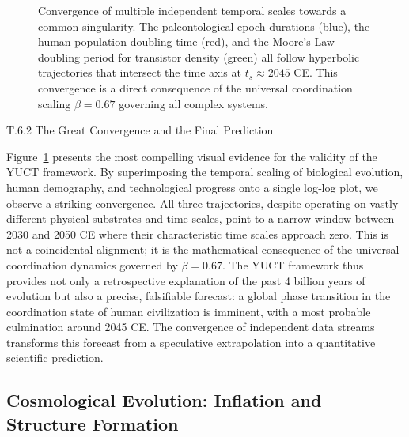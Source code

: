 \documentclass[12pt,a4paper]{article}
\theoremstyle{remark}
\begin{document}
\begin{figure}[htbp]
	\caption{Convergence of multiple independent temporal scales towards a common singularity. The paleontological epoch durations (blue), the human population doubling time (red), and the Moore's Law doubling period for transistor density (green) all follow hyperbolic trajectories that intersect the time axis at $t_s \approx 2045$ CE. This convergence is a direct consequence of the universal coordination scaling $\beta = 0.67$ governing all complex systems.}
	\label{fig:great-convergence}
\end{figure}

T.6.2 The Great Convergence and the Final Prediction

\large Figure~\ref{fig:great-convergence} presents the most compelling visual evidence for the validity of the YUCT framework. By superimposing the temporal scaling of biological evolution, human demography, and technological progress onto a single log‑log plot, we observe a striking convergence. All three trajectories, despite operating on vastly different physical substrates and time scales, point to a narrow window between 2030 and 2050 CE where their characteristic time scales approach zero. This is not a coincidental alignment; it is the mathematical consequence of the universal coordination dynamics governed by $\beta = 0.67$. The YUCT framework thus provides not only a retrospective explanation of the past 4 billion years of evolution but also a precise, falsifiable forecast: a global phase transition in the coordination state of human civilization is imminent, with a most probable culmination around 2045 CE. The convergence of independent data streams transforms this forecast from a speculative extrapolation into a quantitative scientific prediction.

	\subsection{Cosmological Evolution: Inflation and Structure Formation}
	\label{subsec:cosmo}
	
\end{document}
